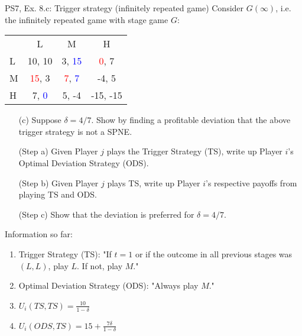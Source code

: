 \begin{frame}{PS7, Ex. 8.c: Trigger strategy (infinitely repeated game)}
    Consider $G(\infty)$, i.e. the infinitely repeated game with stage game $G$: \vspace{-6pt}
    \begin{table}
      \begin{tabular}{l|c|c|c|}
        \multicolumn{1}{c}{} & \multicolumn{1}{c}{L} & \multicolumn{1}{c}{M} & \multicolumn{1}{c}{H} \\\cline{2-4}
        L & 10, 10 & 3, \textcolor{blue}{15} & \textcolor{red}{0}, 7 \\\cline{2-4}
        M & \textcolor{red}{15}, 3 & \textcolor{red}{7}, \textcolor{blue}{7} & -4, 5 \\\cline{2-4}
        H & 7, \textcolor{blue}{0} & 5, -4 & -15, -15 \\\cline{2-4}
      \end{tabular}
    \end{table}
    \begin{itemize}
      \vspace{-4pt} \item[(c)] Suppose $\delta = 4/7$. Show by finding a profitable deviation that the above trigger strategy is not a SPNE. \vspace{-6pt}
    \end{itemize}
    \begin{multicols}{2}
      \begin{itemize}
        \item[(Step a)] Given Player $j$ plays the Trigger Strategy (TS), write up Player $i$'s Optimal Deviation Strategy (ODS).
        \item[(Step b)] Given Player $j$ plays TS, write up Player $i$'s respective payoffs from playing TS and ODS.
        \item[(Step c)] Show that the deviation is preferred for $\delta=4/7$.
      \end{itemize}
      \vfill\null\columnbreak
      Information so far:
      \begin{enumerate}
        \item Trigger Strategy (TS): "If $t=1$ or if the outcome in all previous stages was $(L,L)$, play $L$. If not, play $M$."
        \item Optimal Deviation Strategy (ODS): "Always play $M$."
        \item $U_i(TS,TS)=\frac{10}{1-\delta}$
        \item $U_i(ODS,TS)=15+\frac{7\delta}{1-\delta}$
      \end{enumerate}
      \vfill\null
    \end{multicols}
\end{frame}
